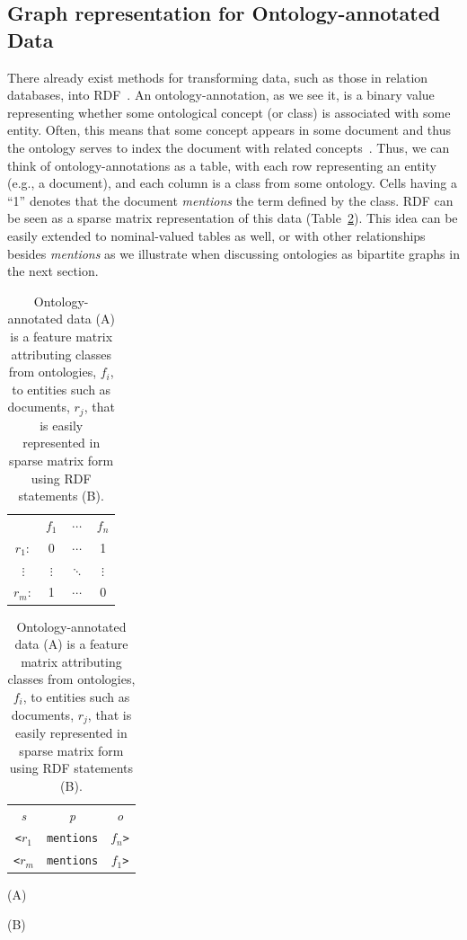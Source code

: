 \subsection{Graph representation for Ontology-annotated Data}
There already exist methods for transforming data, such as those in relation databases, into RDF~\cite{RDB2RDF}. An ontology-annotation, as we see it, is a binary value representing whether some ontological concept (or class) is associated with some entity.  Often, this means that some concept appears in some document and thus the ontology serves to index the document with related concepts~\cite{RI}.  Thus, we can think of ontology-annotations as a table, with each row representing an entity (e.g., a document), and each column is a class from some ontology.  Cells having a ``1'' denotes that the document \emph{mentions} the term defined by the class.  RDF can be seen as a sparse matrix representation of this data (Table~\ref{tbl:binary-rel}).  This idea can be easily extended to nominal-valued tables as well, or with other relationships besides \emph{mentions} as we illustrate when discussing ontologies as bipartite graphs in the next section.
\begin{table}[ht]
\begin{minipage}[b]{0.38\linewidth}\begin{flushright}
\begin{tabular}{ c | c | c | c |}
\cline{2-4}
	~   & $f_1$	    & $\cdots$  & $f_n$   \\
\cline{2-4}
$r_1:$	&  0  	& $\cdots$   &    1  \\
\cline{2-4}
$\vdots$& $\vdots$  & $\ddots$  & $\vdots$\\
\cline{2-4}
$r_m:$	&  1  	& $\cdots$   &    0  \\
\cline{2-4}
\end{tabular}
\end{flushright}
\end{minipage}
\hfill
\begin{minipage}[b]{0.4\linewidth}
\begin{tabular}{c c c}
\emph{s}&   \emph{p}&  \emph{o}\\
\texttt{<$r_1$}   &    \texttt{mentions}   &  \texttt{$f_n$>}\\
\texttt{<$r_m$}   &    \texttt{mentions}   &  \texttt{$f_1$>}\\
\end{tabular}
\end{minipage}
\begin{minipage}[c]{0.4\linewidth}\centering
\vspace{0.2cm}\hspace{1.5cm}(A)
\end{minipage}
\begin{minipage}[c]{0.4\linewidth}\centering
\hspace{2.6cm}(B)
\end{minipage}
\caption{\label{tbl:binary-rel} Ontology-annotated data (A) is a feature matrix attributing classes from ontologies, $f_i$, to entities such as documents, $r_j$, that is easily represented in sparse matrix form using RDF statements (B).}
\end{table}

